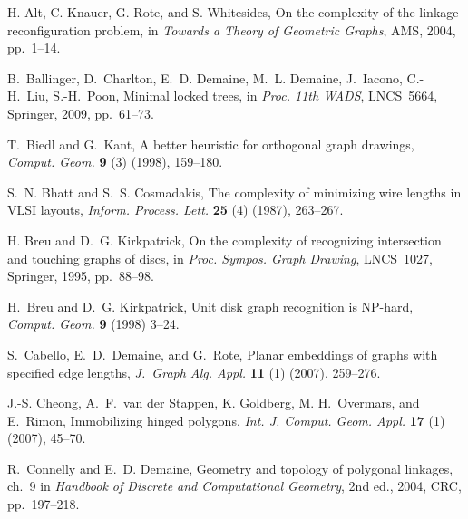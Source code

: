 \documentclass[runningheads]{article}
\begin{document}
\begin{thebibliography}{99}

H. Alt, C. Knauer, G. Rote, and S. Whitesides,
On the complexity of the linkage reconfiguration problem,
in \emph{Towards a Theory of Geometric Graphs},
AMS, 2004, pp.~1--14.


B.~Ballinger, D.~Charlton, E.~D. Demaine, M.~L. Demaine, J.~Iacono, C.-H.~Liu, S.-H.~Poon,
Minimal locked trees,
in \emph{Proc. 11th WADS}, LNCS~5664, Springer, 2009, pp.~61--73.

T.~Biedl and G.~Kant,
A better heuristic for orthogonal graph drawings,
\emph{Comput. Geom.} {\bf 9} (3) (1998), 159--180.

S.~N. Bhatt and S.~S. Cosmadakis,
The complexity of minimizing wire lengths in VLSI layouts,
\emph{Inform. Process. Lett.} {\bf 25} (4) (1987), 263--267.

H. Breu and D.~G. Kirkpatrick,
On the complexity of recognizing intersection and touching graphs of discs,
in \emph{Proc. Sympos. Graph Drawing}, LNCS~1027, Springer,  1995, pp.~88--98.

H.~Breu and D.~G. Kirkpatrick,
Unit disk graph recognition is NP-hard,
\emph{Comput. Geom.} {\bf 9} (1998) 3--24.

S.~Cabello, E.~D.~Demaine, and G.~Rote,
Planar embeddings of graphs with specified edge lengths,
\emph{J.~Graph Alg. Appl.} {\bf 11} (1) (2007), 259--276.


J.-S. Cheong, A.~F.~van der Stappen, K. Goldberg, M. H.~Overmars, and E.~Rimon,
Immobilizing hinged polygons,
\emph{Int. J. Comput. Geom. Appl.} {\bf 17} (1) (2007), 45--70.

R.~Connelly and E.~D. Demaine,
Geometry and topology of polygonal linkages, ch.~9
in \emph{Handbook of Discrete and Computational Geometry}, 2nd ed., 2004, CRC, pp.~197--218.


\end{thebibliography}
\end{document}
